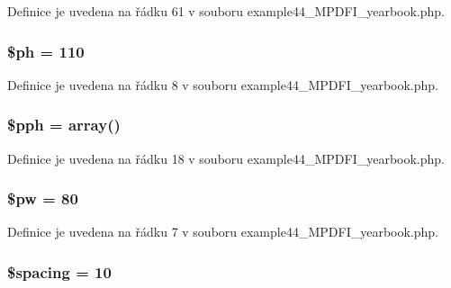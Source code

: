 Definice je uvedena na řádku 61 v souboru example44\-\_\-\-M\-P\-D\-F\-I\-\_\-yearbook.\-php.

\hypertarget{example44___m_p_d_f_i__yearbook_8php_ac1d420fcdb8b362b7909b4f257c9b916}{
\subsubsection[{\$ph}]{\setlength{\rightskip}{0pt plus 5cm}\$ph = 110}}\label{example44___m_p_d_f_i__yearbook_8php_ac1d420fcdb8b362b7909b4f257c9b916}


Definice je uvedena na řádku 8 v souboru example44\-\_\-\-M\-P\-D\-F\-I\-\_\-yearbook.\-php.

\hypertarget{example44___m_p_d_f_i__yearbook_8php_a3f03f6724b9353c21fc68cd67f890b8c}{
\subsubsection[{\$pph}]{\setlength{\rightskip}{0pt plus 5cm}\$pph = array()}}\label{example44___m_p_d_f_i__yearbook_8php_a3f03f6724b9353c21fc68cd67f890b8c}


Definice je uvedena na řádku 18 v souboru example44\-\_\-\-M\-P\-D\-F\-I\-\_\-yearbook.\-php.

\hypertarget{example44___m_p_d_f_i__yearbook_8php_a4a84bb9d73addd9e90f2f34c36035df4}{
\subsubsection[{\$pw}]{\setlength{\rightskip}{0pt plus 5cm}\$pw = 80}}\label{example44___m_p_d_f_i__yearbook_8php_a4a84bb9d73addd9e90f2f34c36035df4}


Definice je uvedena na řádku 7 v souboru example44\-\_\-\-M\-P\-D\-F\-I\-\_\-yearbook.\-php.

\hypertarget{example44___m_p_d_f_i__yearbook_8php_a8cb6ae63c5aaf9108774d2a4310682bc}{
\subsubsection[{\$spacing}]{\setlength{\rightskip}{0pt plus 5cm}\$spacing = 10}}\label{example44___m_p_d_f_i__yearbook_8php_a8cb6ae63c5aaf9108774d2a4310682bc}



